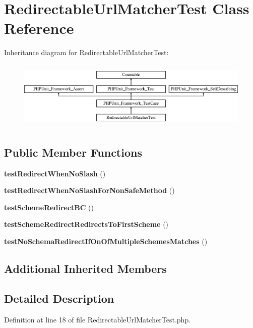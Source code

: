 \section{Redirectable\+Url\+Matcher\+Test Class Reference}
\label{class_symfony_1_1_component_1_1_routing_1_1_tests_1_1_matcher_1_1_redirectable_url_matcher_test}
Inheritance diagram for Redirectable\+Url\+Matcher\+Test\+:\begin{figure}[H]
\begin{center}
\leavevmode
\includegraphics[height=3.303835cm]{class_symfony_1_1_component_1_1_routing_1_1_tests_1_1_matcher_1_1_redirectable_url_matcher_test}
\end{center}
\end{figure}
\subsection*{Public Member Functions}
\begin{DoxyCompactItemize}
\item 
{\bf test\+Redirect\+When\+No\+Slash} ()
\item 
{\bf test\+Redirect\+When\+No\+Slash\+For\+Non\+Safe\+Method} ()
\item 
{\bf test\+Scheme\+Redirect\+B\+C} ()
\item 
{\bf test\+Scheme\+Redirect\+Redirects\+To\+First\+Scheme} ()
\item 
{\bf test\+No\+Schema\+Redirect\+If\+On\+Of\+Multiple\+Schemes\+Matches} ()
\end{DoxyCompactItemize}
\subsection*{Additional Inherited Members}


\subsection{Detailed Description}


Definition at line 18 of file Redirectable\+Url\+Matcher\+Test.\+php.



